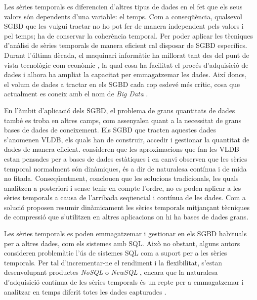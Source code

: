 Les sèries temporals es diferencien d'altres tipus de dades en el fet
que els seus valors són dependents d'una variable: el temps. Com a
conseqüència, qualsevol \gls{SGBD} que les vulgui tractar no ho pot
fer de manera independent pels valors i pel temps; ha de conservar la
coherència temporal.  
%
Per poder aplicar les tècniques d'anàlisi de sèries temporals de
manera eficient cal disposar de \gls{SGBD} específics.  Durant
l'última dècada, el maquinari informàtic ha millorat tant des del punt
de vista tecnològic com econòmic \parencite{deligiannakis07}, la qual
cosa ha facilitat el procés d'adquisició de dades i alhora ha ampliat
la capacitat per emmagatzemar les dades.  Així doncs, el volum de
dades a tractar en els \gls{SGBD} cada cop esdevé més crític, cosa que
actualment es coneix amb el nom de \emph{Big
  Data} \parencite{jagadish14:bigdata}.



 
En l'àmbit d'aplicació dels \gls{SGBD}, el problema de grans
quantitats de dades també es troba en altres camps, com assenyalen
\textcite{mylopoulos96} quant a la necessitat de grans bases de dades
de coneixement. Els \gls{SGBD} que tracten aquestes dades s'anomenen
\gls{VLDB}, els quals han de construir, accedir i gestionar la
quantitat de dades de manera eficient.
%
\textcite{ogras06} consideren que les aproximacions que fan les
\gls{VLDB} estan pensades per a bases de dades estàtiques i en canvi
observen que les sèries temporal normalment són dinàmiques, és a dir
de naturalesa contínua i de mida no fitada. Conseqüentment, conclouen
que les solucions tradicionals, les quals analitzen a posteriori i
sense tenir en compte l'ordre, no es poden aplicar a les sèries
temporals a causa de l'arribada seqüencial i contínua de les dades.
Com a solució proposen resumir dinàmicament les sèries temporals
mitjançant tècniques de compressió que s'utilitzen en altres
aplicacions on hi ha bases de dades grans.



Les sèries temporals es poden emmagatzemar i gestionar en els
\gls{SGBD} habituals per a altres dades, com els sistemes amb
\gls{SQL}.  Això no obstant, alguns
autors \parencite{dreyer94,schmidt95,stonebraker09:scidb,zhang11}
consideren problemàtic l'ús de sistemes \gls{SQL} com a suport per a
les sèries temporals. Per tal d'incrementar-ne el rendiment i la
flexibilitat, s'estan desenvolupant productes \emph{NoSQL} o
\emph{NewSQL} \parencite{atzeni13:relational_model_dead,stonebraker10,stonebraker09:scidb,zhang11},
encara que la naturalesa d'adquisició contínua de les sèries temporals
és un repte per a emmagatzemar i analitzar en temps diferit totes les
dades capturades \parencite{keogh97}.


